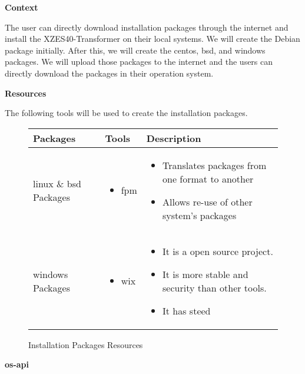 \textbf{Context}

The user can directly download installation packages through the internet and install the XZES40-Transformer on their local systems.
We will create the Debian package initially.
After this, we will create the \gls{centos}, \gls{bsd}, and \gls{windows} packages.
We will upload those packages to the internet and the users can directly download the packages in their operation system.

\textbf{Resources}

The following tools will be used to create the installation packages. 
\begin{figure}[H]
  \begin{center}                                                                       
    \begin{tabular}{ | p{2.5cm} | p{5cm} | p{5cm} | }
    \hline
      Packages & Tools & Description \\ \hline
      \gls{linux} \& \gls{bsd} Packages  & 
      \begin{itemize}
      \item \gls{fpm}
      \end{itemize} &
      \begin{itemize}
      \item Translates packages from one format to another
      \item Allows re-use of other system's packages
      \end{itemize} \\ \hline

      \gls{windows} Packages & 
      \begin{itemize}
      \item \gls{wix}
      \end{itemize} &
      \begin{itemize}
      \item It is a open source project.
      \item It is more stable and security than other tools.
      \item It has steed
      \end{itemize} \\ \hline

    \end{tabular}
\end{center}
\caption{Installation Packages Resources}
\end{figure}
\textbf{\gls{os-api}}
\label{os-agnostic-api}

